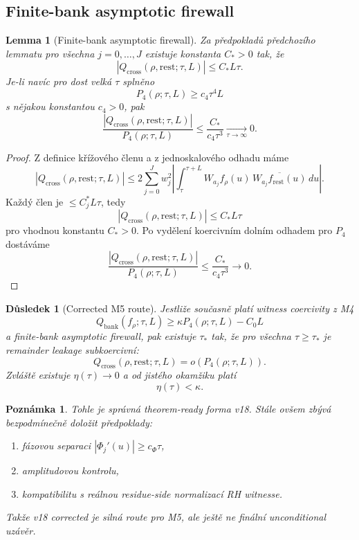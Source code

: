 \documentclass[11pt,a4paper]{article}
\newtheorem{lemma}[theorem]{Lemma}
\newtheorem{corollary}[theorem]{Důsledek}
\newtheorem{remark}[theorem]{Poznámka}
\begin{document}
\subsection*{Finite-bank asymptotic firewall}

\begin{lemma}[Finite-bank asymptotic firewall]
Za předpokladů předchozího lemmatu pro všechna \(j=0,\dots,J\) existuje konstanta \(C_*>0\) tak, že
\[
|Q_{\mathrm{cross}}(\rho,\mathrm{rest};\tau,L)|\le C_*L\tau.
\]
Je-li navíc pro dost velká \(\tau\) splněno
\[
P_4(\rho;\tau,L)\ge c_4\tau^4L
\]
s nějakou konstantou \(c_4>0\), pak
\[
\frac{|Q_{\mathrm{cross}}(\rho,\mathrm{rest};\tau,L)|}{P_4(\rho;\tau,L)}
\le
\frac{C_*}{c_4\tau^3}\xrightarrow[\tau\to\infty]{}0.
\]
\end{lemma}

\begin{proof}
Z definice křížového členu a z jednoskalového odhadu máme
\[
|Q_{\mathrm{cross}}(\rho,\mathrm{rest};\tau,L)|
\le
2\sum_{j=0}^{J} w_j^2
\left|
\int_\tau^{\tau+L}
W_{a_j}f_\rho(u)\,\overline{W_{a_j}f_{\mathrm{rest}}(u)}\,du
\right|.
\]
Každý člen je \(\le C_j^*L\tau\), tedy
\[
|Q_{\mathrm{cross}}(\rho,\mathrm{rest};\tau,L)|
\le
C_*L\tau
\]
pro vhodnou konstantu \(C_*>0\).
Po vydělení koercivním dolním odhadem pro \(P_4\) dostáváme
\[
\frac{|Q_{\mathrm{cross}}(\rho,\mathrm{rest};\tau,L)|}{P_4(\rho;\tau,L)}
\le
\frac{C_*}{c_4\tau^3}\to 0.
\]
\end{proof}

\begin{corollary}[Corrected M5 route]
Jestliže současně platí witness coercivity z M4
\[
Q_{\mathrm{bank}}(f_\rho;\tau,L)\ge \kappa P_4(\rho;\tau,L)-C_0L
\]
a finite-bank asymptotic firewall, pak existuje \(\tau_*\) tak, že pro všechna \(\tau\ge \tau_*\)
je remainder leakage subkoercivní:
\[
Q_{\mathrm{cross}}(\rho,\mathrm{rest};\tau,L)
=
o\!\left(P_4(\rho;\tau,L)\right).
\]
Zvláště existuje \(\eta(\tau)\to 0\) a od jistého okamžiku platí
\[
\eta(\tau)<\kappa.
\]
\end{corollary}

\begin{remark}
Tohle je správná theorem-ready forma v18. Stále ovšem zbývá bezpodmínečně doložit
předpoklady:
\begin{enumerate}[label=\textbf{(\arabic*)}]
    \item fázovou separaci \(|\Phi_j'(u)|\ge c_\Phi\tau\),
    \item amplitudovou kontrolu,
    \item kompatibilitu s reálnou residue-side normalizací RH witnesse.
\end{enumerate}
Takže v18 corrected je silná route pro M5, ale ještě ne finální unconditional uzávěr.
\end{remark}
\end{document}
